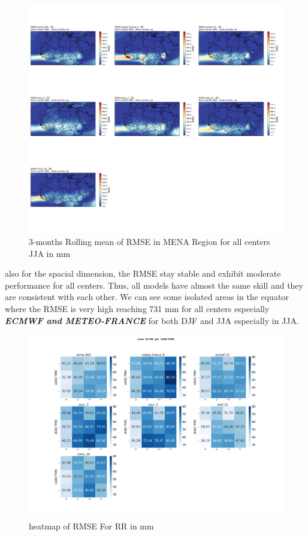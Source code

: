 \begin{figure}[H]
\centering
\includegraphics[scale=0.3]{plots/det/rmse/rmse_jja_RR.png}
\caption{3-months Rolling mean of RMSE in MENA Region for all centers JJA in mm}
\end{figure}

also for the spacial dimension, the RMSE stay stable and exhibit moderate performance for all centers. Thus, all models have almost the same skill and they are consistent with each other. We can see some isolated areas in the equator where the RMSE is very high reaching 731 mm for all centers especially \textbf{\textit{ECMWF and METEO-FRANCE}} for both DJF and JJA especially in JJA.

\begin{figure}[H]
\centering
\includegraphics[scale=0.3]{plots/det/rmse/rmse_RR_mena.png}
\caption{heatmap of RMSE For RR in mm}
\end{figure}

